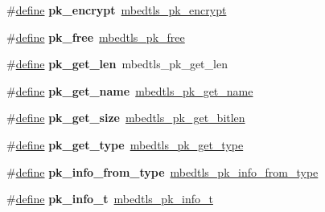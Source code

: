 \begin{DoxyCompactItemize}
\item 
\mbox{\label{compat-1_83_8h_a19713ec4b6598c243bc665c5234623c1}} 
\#\hyperlink{structdefine}{define} {\bfseries pk\+\_\+encrypt}~\hyperlink{pk_8h_ae543fd58f365e84cdfe3689ee2f10113}{mbedtls\+\_\+pk\+\_\+encrypt}
\item 
\mbox{\label{compat-1_83_8h_a6ca9f90e0b218fa958563f567de2082b}} 
\#\hyperlink{structdefine}{define} {\bfseries pk\+\_\+free}~\hyperlink{pk_8h_ac6a9786d96abfd73c4dff6814238feb9}{mbedtls\+\_\+pk\+\_\+free}
\item 
\mbox{\label{compat-1_83_8h_ac66df577f04b58338038ef44cc7be992}} 
\#\hyperlink{structdefine}{define} {\bfseries pk\+\_\+get\+\_\+len}~mbedtls\+\_\+pk\+\_\+get\+\_\+len
\item 
\mbox{\label{compat-1_83_8h_a5f9942ed021e7c2c0d45757fce7d3dc0}} 
\#\hyperlink{structdefine}{define} {\bfseries pk\+\_\+get\+\_\+name}~\hyperlink{pk_8h_a1b0fb8d16905ec72515dd574b77a4518}{mbedtls\+\_\+pk\+\_\+get\+\_\+name}
\item 
\mbox{\label{compat-1_83_8h_aab133dff315d7e015f5b840aa66b144f}} 
\#\hyperlink{structdefine}{define} {\bfseries pk\+\_\+get\+\_\+size}~\hyperlink{pk_8h_a4a31083a590b155dd54d22cf618eefcc}{mbedtls\+\_\+pk\+\_\+get\+\_\+bitlen}
\item 
\mbox{\label{compat-1_83_8h_acf247de4cccefdb1eee599aa773c835e}} 
\#\hyperlink{structdefine}{define} {\bfseries pk\+\_\+get\+\_\+type}~\hyperlink{pk_8h_ab568e6594c1c4cffaa5046e1e0cada55}{mbedtls\+\_\+pk\+\_\+get\+\_\+type}
\item 
\mbox{\label{compat-1_83_8h_ad13dc6ba5c9ed9ae8d6e0c5247dbe021}} 
\#\hyperlink{structdefine}{define} {\bfseries pk\+\_\+info\+\_\+from\+\_\+type}~\hyperlink{pk_8h_a05eb3e96499280b250cb71e2ef2d270b}{mbedtls\+\_\+pk\+\_\+info\+\_\+from\+\_\+type}
\item 
\mbox{\label{compat-1_83_8h_a688e67610e818e68bfe4390a99cab6b5}} 
\#\hyperlink{structdefine}{define} {\bfseries pk\+\_\+info\+\_\+t}~\hyperlink{structmbedtls__pk__info__t}{mbedtls\+\_\+pk\+\_\+info\+\_\+t}
\item 

\end{DoxyCompactItemize}
